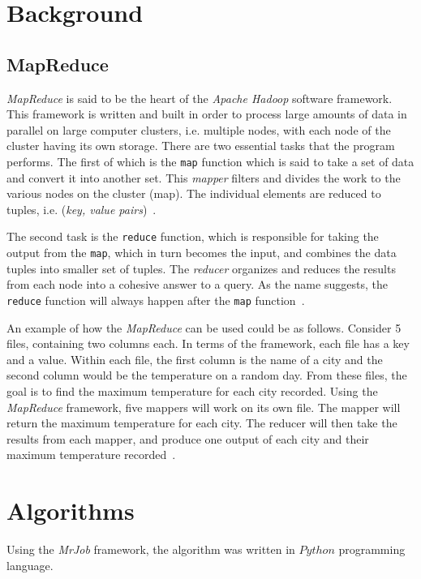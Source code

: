 \documentclass[10pt, conference]{IEEEtran}
\def\code#1{\texttt{#1}}
\begin{document}
\section{Background}
\label{Background}

\subsection{MapReduce}
\label{MapReduce}

\emph{MapReduce} is said to be the heart of the \emph{Apache Hadoop} software framework. This framework is written and built in order to process large amounts of data in parallel on large computer clusters, i.e. multiple nodes, with each node of the cluster having its own storage. There are two essential tasks that the program performs. The first of which is the \code{map} function which is said to take a set of data and convert it into another set. This \emph{mapper} filters and divides the work to the various nodes on the cluster (map). The individual elements are reduced to tuples, i.e. (\emph{key, value pairs})~\cite{WhatIs, IBM, Hadoop}.

The second task is the \code{reduce} function, which is responsible for taking the output from the \code{map}, which in turn becomes the input, and combines the data tuples into smaller set of tuples. The \emph{reducer} organizes and reduces the results from each node into a cohesive answer to a query. As the name suggests, the \code{reduce} function will always happen after the \code{map} function~\cite{WhatIs, IBM, Hadoop}.

An example of how the \emph{MapReduce} can be used could be as follows. Consider 5 files, containing two columns each. In terms of the framework, each file has a key and a value. Within each file, the first column is the name of a city and the second column would be the temperature on a random day. From these files, the goal is to find the maximum temperature for each city recorded. Using the \emph{MapReduce} framework, five mappers will work on its own file. The mapper will return the maximum temperature for each city. The reducer will then take the results from each mapper, and produce one output of each city and their maximum temperature recorded~\cite{IBM}.

\section{Algorithms}
\label{Algorithms}
Using the \emph{MrJob} framework, the algorithm was written in $Python$ programming language.
\end{document}
